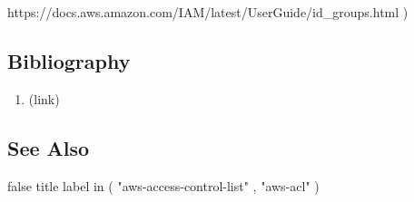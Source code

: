 https://docs.aws.amazon.com/IAM/latest/UserGuide/id\_groups.html  )  \subsection*{Bibliography } \begin{enumerate} \item  (link) \href{AWS, 11/2020 }{ }   \end{enumerate} \subsection*{See Also } false  title  label in ( "aws-access-control-list" , "aws-acl" )  